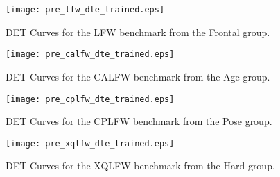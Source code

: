 \documentclass[class=report, crop=false, a4paper, 12pt]{standalone}
\begin{document}
\begin{figure}[H]
    \centering
    \begin{adjustbox}{center, minipage=1.2\textwidth, margin=0cm -0.1cm 0cm -0.1cm}  %
        \begin{minipage}[c]{0.49\textwidth}
            \centering
            \texttt{[image: pre\_lfw\_dte\_trained.eps]}
            \caption{DET Curves for the LFW benchmark from the Frontal group.}
            \label{fig:dte_lfw}
        \end{minipage}
        \hfill
        \begin{minipage}[c]{0.49\textwidth}
            \centering
            \texttt{[image: pre\_calfw\_dte\_trained.eps]}
            \caption{DET Curves for the CALFW benchmark from the Age group.}
            \label{fig:dte_lfw}
        \end{minipage}
    \end{adjustbox}
    \vspace{-0.4cm}
  \end{figure}
  
\begin{figure}[H]
\begin{adjustbox}{center, minipage=1.2\textwidth, margin=0cm -0.1cm 0cm -0.1cm}  %
    \begin{minipage}[c]{0.49\textwidth}
        \centering
        \texttt{[image: pre\_cplfw\_dte\_trained.eps]}
        \caption{DET Curves for the CPLFW benchmark from the Pose group.}
        \label{fig:dte_cplfw}
    \end{minipage}
    \hfill
    \begin{minipage}[c]{0.49\textwidth}
        \centering
        \texttt{[image: pre\_xqlfw\_dte\_trained.eps]}
        \caption{DET Curves for the XQLFW benchmark from the Hard group.}
        \label{fig:dte_xqlfw}
    \end{minipage}
\end{adjustbox}
\vspace{-0.4cm}
\end{figure}
\end{document}
